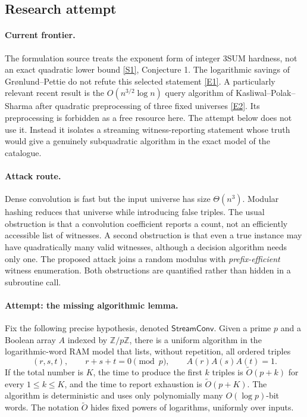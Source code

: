 \documentclass[11pt,a4paper]{article}
\newcommand{\Z}{\mathbb{Z}}
\newcommand{\sref}[2]{\hyperlink{source:#1:#2}{[S#2]}}
\newcommand{\eref}[2]{\hyperlink{extra:#1:#2}{[E#2]}}
\numberwithin{equation}{section}
\begin{document}
\subsection{Research attempt}

\paragraph{Current frontier.}
The formulation source treats the exponent form of integer 3SUM hardness,
not an exact quadratic lower bound \sref{30006762}{1}, Conjecture 1. The
logarithmic savings of Gr\o nlund--Pettie do not refute this selected
statement \eref{30006762}{1}. A particularly relevant recent result is the
$O(n^{3/2}\log n)$ query algorithm of Kasliwal--Polak--Sharma after
quadratic preprocessing of three fixed universes
\eref{30006762}{2}. Its preprocessing is forbidden as a free resource here.
The attempt below does not use it. Instead it isolates a streaming
witness-reporting statement whose truth would give a genuinely
subquadratic algorithm in the exact model of the catalogue.

\paragraph{Attack route.}
Dense convolution is fast but the input universe has size $\Theta(n^3)$.
Modular hashing reduces that universe while introducing false triples.
The usual obstruction is that a convolution coefficient reports a count,
not an efficiently accessible list of witnesses. A second obstruction is
that even a true instance may have quadratically many valid witnesses,
although a decision algorithm needs only one. The proposed attack joins a
random modulus with \emph{prefix-efficient} witness enumeration. Both
obstructions are quantified rather than hidden in a subroutine call.

\paragraph{Attempt: the missing algorithmic lemma.}
Fix the following precise hypothesis, denoted $\mathsf{StreamConv}$.
Given a prime $p$ and a Boolean array $A$ indexed by $\Z/p\Z$, there is a
uniform algorithm in the logarithmic-word RAM model that lists, without
repetition, all ordered triples
\begin{equation}\label{30006762:residue-triples}
 (r,s,t),\qquad r+s+t=0\pmod p,\qquad A(r)A(s)A(t)=1.
\end{equation}
If the total number is $K$, the time to produce the first $k$ triples is
$\widetilde O(p+k)$ for every $1\le k\le K$, and the time to report
exhaustion is $\widetilde O(p+K)$. The algorithm is deterministic and uses
only polynomially many $O(\log p)$-bit words. The notation
$\widetilde O$ hides fixed powers of logarithms, uniformly over inputs.
\end{document}
